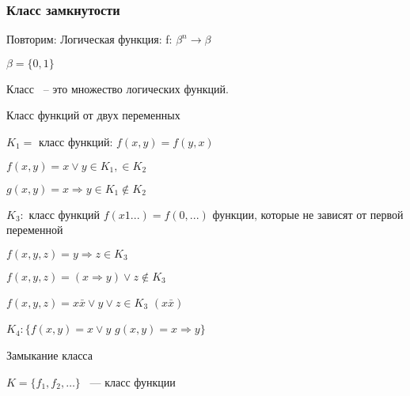 \documentclass[russian]{lecture-notes}
\begin{document}
	\subsubsection{Класс замкнутости}

	Повторим: Логическая функция: f: $\beta^{n} \rightarrow \beta$

	$\beta = \{0,1\}$

	\begin{definition}
		Класс ~-- это множество логических функций.
	\end{definition}

	\begin{example}
		Класс функций от двух переменных

		$K_{1} = $ класс функций: $f(x,y) = f(y,x)$

		$f(x,y) = x \lor y \in K_{1}, \in K_{2}$

		$g(x,y) = x \Rightarrow y \in K_{1} \notin K_{2}$

		$K_{3}:$ класс функций $f(x1...) = f(0, ...)$
		функции, которые не зависят от первой переменной

		$f(x,y,z) = y \Rightarrow z \in K_{3}$

		$f(x,y,z) = (x \Rightarrow y) \lor z \notin K_{3}$

		$f(x,y,z) = x\bar{x} \lor y \lor z \in K_{3}$ \quad $(x \bar{x})$

		$K_{4}: \{f(x,y) = x \lor y$  $ g(x,y) = x \Rightarrow y\}$

		\end{example}

		\begin{definition}
			Замыкание класса

			$K = \{f_{1},f_{2},\dots\}$ ~--- класс функции

			\end{definition}
\end{document}
